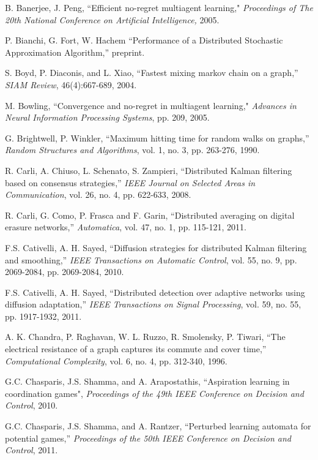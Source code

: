 \documentclass[final]{siamltex}
\begin{document}
\begin{thebibliography}{99}
 B. Banerjee, J. Peng, ``Efficient no-regret multiagent learning," {\em Proceedings of The 20th National Conference on Artificial
Intelligence,} 2005.

 P. Bianchi, G. Fort, W. Hachem ``Performance of a Distributed Stochastic Approximation Algorithm,'' 
preprint. 

 S. Boyd, P. Diaconis, and L. Xiao, ``Fastest mixing markov
chain on a graph,'' {\em SIAM Review}, 46(4):667-689, 2004.

 M. Bowling, ``Convergence and no-regret in multiagent
learning," {\em Advances in Neural Information Processing
Systems}, pp. 209,  2005.

 G. Brightwell, P. Winkler, ``Maximum hitting time for random walks on graphs,'' {\em Random Structures and Algorithms}, 
vol. 1, no. 3, pp. 263-276, 1990.

 R. Carli, A. Chiuso, 	L. Schenato, S. Zampieri, ``Distributed Kalman filtering based on consensus strategies,'' 
{\em IEEE Journal on Selected Areas in Communication}, vol. 26, no. 4, pp. 622-633, 2008.

 R. Carli, G. Como, P. Frasca and F. Garin, ``Distributed averaging on digital erasure networks,'' 
{\em Automatica}, vol. 47, no. 1, pp. 115-121, 2011. 

 F.S. Cativelli, A. H. Sayed, ``Diffusion strategies for distributed Kalman filtering and smoothing,'' {\em IEEE Transactions on Automatic Control}, vol. 55, no. 9, pp. 2069-2084, pp. 2069-2084, 2010. 

 F.S. Cativelli, A. H. Sayed, ``Distributed detection over adaptive networks using diffusion adaptation,'' {\em IEEE Transactions on
Signal Processing}, vol. 59, no. 55, pp. 1917-1932, 2011. 

 A. K. Chandra, P. Raghavan, W. L. Ruzzo, R. Smolensky, P. Tiwari, ``The electrical resistance of a graph captures its commute and
cover time,'' {\em Computational Complexity}, vol. 6, no. 4, pp. 312-340, 1996. 

 G.C. Chasparis, J.S. Shamma, and A. Arapostathis, ``Aspiration learning in coordination games", {\em Proceedings of the 49th IEEE Conference on Decision and Control}, 2010. 

 G.C. Chasparis, J.S. Shamma, and A. Rantzer, ``Perturbed learning automata for potential games,'' {\em Proceedings of the 50th IEEE Conference on Decision and Control}, 2011. 


\end{thebibliography}
\end{document}
